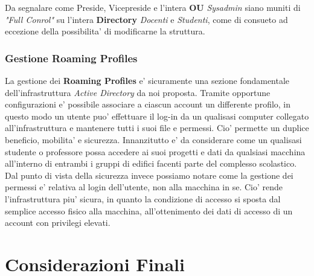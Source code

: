 \documentclass{report}
\begin{document}
            Da segnalare come Preside, Vicepreside e l'intera \textbf{OU} \emph{Sysadmin} siano muniti di
             \emph{"Full Conrol"} su l'intera \textbf{Directory} \emph{Docenti} e \emph{Studenti}, come di
             consueto ad eccezione della possibilita' di modificarne la struttura.
            \subsection{Gestione Roaming Profiles}
            La gestione dei \textbf{Roaming Profiles} e' sicuramente una sezione fondamentale dell'infrastruttura
             \emph{Active Directory} da noi proposta. Tramite opportune configurazioni e' possibile associare 
             a ciascun account un differente profilo, in questo modo un utente puo' effettuare il log-in da un
             qualisasi computer collegato all'infrastruttura e mantenere tutti i suoi file e permessi.
            Cio' permette un duplice beneficio, mobilita' e sicurezza. Innanzitutto e' da considerare come 
             un qualisasi studente o professore possa accedere ai suoi progetti e dati da qualsiasi macchina 
             all'interno di entrambi i gruppi di edifici facenti parte del complesso scolastico. Dal punto 
             di vista della sicurezza invece possiamo notare come la gestione dei permessi e' relativa al
             login dell'utente, non alla macchina in se. Cio' rende l'infrastruttura piu' sicura, in quanto
             la condizione di accesso si sposta dal semplice accesso fisico alla macchina, all'ottenimento dei
             dati di accesso di un account con privilegi elevati.
    \chapter{Considerazioni Finali}
            
\end{document}
